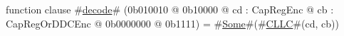 function clause #\hyperref[zdecode]{decode}# (0b010010 @ 0b10000 @ cd : CapRegEnc @ cb : CapRegOrDDCEnc @ 0b0000000 @ 0b1111) = #\hyperref[zSome]{Some}#(#\hyperref[zCLLC]{CLLC}#(cd, cb))
